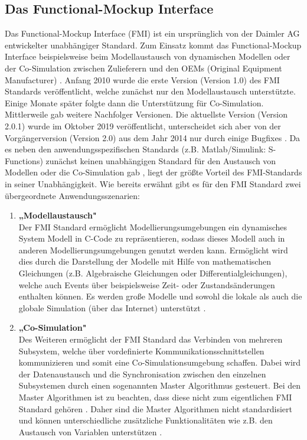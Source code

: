 \subsection{Das Functional-Mockup Interface}\label{sec:DasFMU}
Das Functional-Mockup Interface (FMI) ist ein ursprünglich von der Daimler AG entwickelter unabhängiger Standard. Zum Einsatz kommt das Functional-Mockup Interface beispielsweise beim Modellaustausch von dynamischen Modellen oder der Co-Simulation zwischen Zulieferern und den OEMs (Original Equipment Manufacturer) \cite[S.1]{24}.
Anfang 2010 wurde die erste Version (Version 1.0) des FMI Standards veröffentlicht, welche zunächst nur den Modellaustausch unterstützte. Einige Monate später folgte dann die Unterstützung für Co-Simulation. Mittlerweile gab weitere Nachfolger Versionen. Die aktuellste Version (Version 2.0.1) wurde im Oktober 2019 veröffentlicht, unterscheidet sich aber von der Vorgängerversion (Version 2.0) aus dem Jahr 2014 nur durch einige Bugfixes \cite[S.2]{25}.
Da es neben den anwendungsspezifischen Standards (z.B. Matlab/Simulink: S-Functions) zunächst keinen unabhängigen Standard für den Austausch von Modellen oder die Co-Simulation gab \cite[S.1]{24}, liegt der größte Vorteil des FMI-Standards in seiner Unabhängigkeit.
\newline
Wie bereits erwähnt gibt es für den FMI Standard zwei übergeordnete Anwendungsszenarien:
\begin{enumerate}
	\item \textbf{„Modellaustausch"} \cite[S.4]{25} \\
	Der FMI Standard ermöglicht Modellierungsumgebungen ein dynamisches System Modell in C-Code zu repräsentieren, sodass dieses Modell auch in anderen Modellierungsumgebungen genutzt werden kann. Ermöglicht wird dies durch die Darstellung der Modelle mit Hilfe von mathematischen Gleichungen (z.B. Algebraische Gleichungen oder Differentialgleichungen), welche auch Events über beispielsweise Zeit- oder Zustandsänderungen enthalten können. Es werden große Modelle und sowohl die lokale als auch die globale Simulation (über das Internet) unterstützt \cite[S.4]{25}.
	\item \textbf{„Co-Simulation"} \cite[S.4]{25} \\
	Des Weiteren ermöglicht der FMI Standard das Verbinden von mehreren Subsystem, welche über vordefinierte Kommunikationsschnittstellen kommunizieren und somit eine Co-Simulationsumgebung schaffen. Dabei wird der Datenaustausch und die Synchronisation zwischen den einzelnen Subsystemen durch einen sogenannten Master Algorithmus gesteuert. Bei den Master Algorithmen ist zu beachten, dass diese nicht zum eigentlichen FMI Standard gehören \cite[S.4]{25}. Daher sind die Master Algorithmen nicht standardisiert und können unterschiedliche zusätzliche Funktionalitäten wie z.B. den Austausch von Variablen unterstützen \cite[S.1]{24}.
\end{enumerate}
